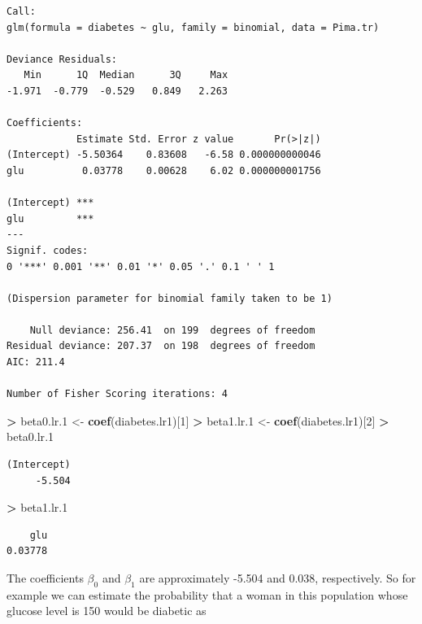\documentclass[
]{krantz}
\makeatletter
\newenvironment{Shaded}{\begin{snugshade}}{\end{snugshade}}
\newcommand{\DecValTok}[1]{\textcolor[rgb]{0.06,0.06,0.06}{#1}}
\newcommand{\FloatTok}[1]{\textcolor[rgb]{0.06,0.06,0.06}{#1}}
\newcommand{\KeywordTok}[1]{\textcolor[rgb]{0.27,0.27,0.27}{\textbf{#1}}}
\newcommand{\NormalTok}[1]{#1}
\newcommand{\OperatorTok}[1]{\textcolor[rgb]{0.43,0.43,0.43}{\textbf{#1}}}
\newcommand{\StringTok}[1]{\textcolor[rgb]{0.5,0.5,0.5}{#1}}
\newenvironment{kframe}{%
\medskip{}
\setlength{\fboxsep}{.8em}
 \def\at@end@of@kframe{}%
 \ifinner\ifhmode%
  \def\at@end@of@kframe{\end{minipage}}%
  \begin{minipage}{\columnwidth}%
 \fi\fi%
 \def\FrameCommand##1{\hskip\@totalleftmargin \hskip-\fboxsep
 \colorbox{shadecolor}{##1}\hskip-\fboxsep
     \hskip-\linewidth \hskip-\@totalleftmargin \hskip\columnwidth}%
 \MakeFramed {\advance\hsize-\width
   \@totalleftmargin\z@ \linewidth\hsize
   \@setminipage}}%
 {\par\unskip\endMakeFramed%
 \at@end@of@kframe}
\renewenvironment{Shaded}{\begin{kframe}}{\end{kframe}}
\makeatother
\begin{document}
\begin{verbatim}
Call:
glm(formula = diabetes ~ glu, family = binomial, data = Pima.tr)

Deviance Residuals: 
   Min      1Q  Median      3Q     Max  
-1.971  -0.779  -0.529   0.849   2.263  

Coefficients:
            Estimate Std. Error z value       Pr(>|z|)
(Intercept) -5.50364    0.83608   -6.58 0.000000000046
glu          0.03778    0.00628    6.02 0.000000001756
               
(Intercept) ***
glu         ***
---
Signif. codes:  
0 '***' 0.001 '**' 0.01 '*' 0.05 '.' 0.1 ' ' 1

(Dispersion parameter for binomial family taken to be 1)

    Null deviance: 256.41  on 199  degrees of freedom
Residual deviance: 207.37  on 198  degrees of freedom
AIC: 211.4

Number of Fisher Scoring iterations: 4
\end{verbatim}

\begin{Shaded}
\begin{Highlighting}[]
\OperatorTok{\textgreater{}}\StringTok{ }\NormalTok{beta0.lr}\FloatTok{.1}\NormalTok{ \textless{}{-}}\StringTok{ }\KeywordTok{coef}\NormalTok{(diabetes.lr1)[}\DecValTok{1}\NormalTok{]}
\OperatorTok{\textgreater{}}\StringTok{ }\NormalTok{beta1.lr}\FloatTok{.1}\NormalTok{ \textless{}{-}}\StringTok{ }\KeywordTok{coef}\NormalTok{(diabetes.lr1)[}\DecValTok{2}\NormalTok{]}
\OperatorTok{\textgreater{}}\StringTok{ }\NormalTok{beta0.lr}\FloatTok{.1}
\end{Highlighting}
\end{Shaded}

\begin{verbatim}
(Intercept) 
     -5.504 
\end{verbatim}

\begin{Shaded}
\begin{Highlighting}[]
\OperatorTok{\textgreater{}}\StringTok{ }\NormalTok{beta1.lr}\FloatTok{.1}
\end{Highlighting}
\end{Shaded}

\begin{verbatim}
    glu 
0.03778 
\end{verbatim}

The coefficients \(\beta_0\) and \(\beta_1\) are approximately -5.504 and
0.038, respectively. So for example we can estimate the probability that a woman in this population whose glucose level is 150 would be diabetic as
\end{document}
